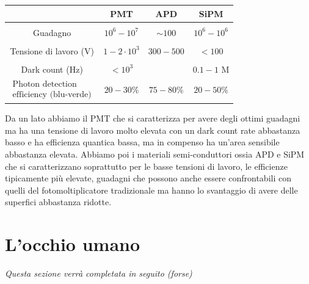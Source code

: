 \begin{center}
   \begin{tabular}{|c|c|c|c|}
      \hline
       & PMT & APD & SiPM\\
      \hline
      &&&\\[-0.45cm]
      Guadagno & $10^6-10^7$ & $\sim 100$ & $10^6-10^6$\\
      \hline
      &&&\\[-0.45cm]
      Tensione di lavoro (V) & $1-2 \cdot 10^3$ & $300 - 500$ & $<100$\\
      \hline
      &&&\\[-0.45cm]
      Dark count (Hz) & $<10^3$ & & $0.1-1$ M\\
      \hline
      $\begin{array}{cc}
         \text{Photon detection}\\
         \text{efficiency (blu-verde)}
      \end{array}$
      & $20-30\%$ & $75-80\%$ & $20-50\%$\\
      \hline
   \end{tabular}
\end{center}
Da un lato abbiamo il PMT che si caratterizza per avere degli ottimi guadagni ma ha una tensione di lavoro molto elevata con un dark count rate abbastanza basso e ha efficienza quantica bassa, ma in compenso ha un'area sensibile abbastanza elevata. Abbiamo poi i materiali semi-conduttori ossia APD e SiPM che si caratterizzano soprattutto per le basse tensioni di lavoro, le efficienze tipicamente più elevate, guadagni che possono anche essere confrontabili con quelli del fotomoltiplicatore tradizionale ma hanno lo svantaggio di avere delle superfici abbastanza ridotte.

\section{L'occhio umano}

\textit{Questa sezione verrà completata in seguito (forse)}


